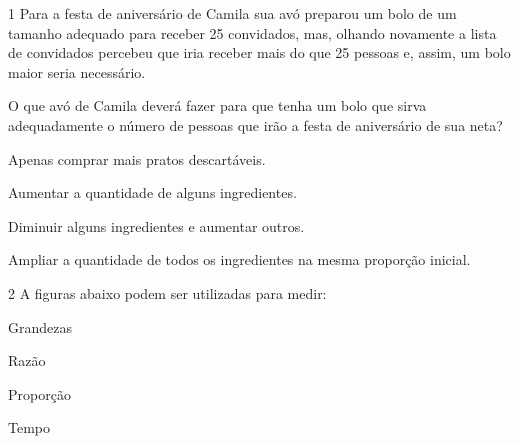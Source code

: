 
\num{1} Para a festa de aniversário de Camila sua avó preparou um bolo de
um tamanho adequado para receber 25 convidados, mas, olhando novamente a
lista de convidados percebeu que iria receber mais do que 25 pessoas e,
assim, um bolo maior seria necessário.

O que avó de Camila deverá fazer para que tenha um bolo que sirva
adequadamente o número de pessoas que irão a festa de aniversário de sua
neta?

\begin{escolha}
\item
  Apenas comprar mais pratos descartáveis.
\item
  Aumentar a quantidade de alguns ingredientes.
\item
  Diminuir alguns ingredientes e aumentar outros.
\item
  Ampliar a quantidade de todos os ingredientes na mesma proporção
  inicial.
\end{escolha}


\num{2} A figuras abaixo podem ser utilizadas para medir:

%
%
%

\begin{escolha}
\item
  Grandezas
\item
  Razão
\item
  Proporção
\item
  Tempo
\end{escolha}

